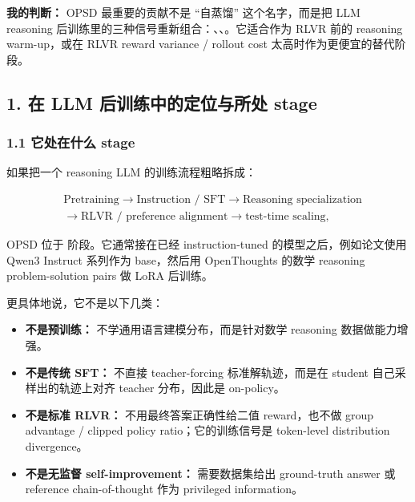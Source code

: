\begin{summarybox}
\textbf{我的判断：} OPSD 最重要的贡献不是 ``自蒸馏'' 这个名字，而是把 LLM reasoning 后训练里的三种信号重新组合：、、。它适合作为 RLVR 前的 reasoning warm-up，或在 RLVR reward variance / rollout cost 太高时作为更便宜的替代阶段。
\end{summarybox}

\subsection{1. 在 LLM 后训练中的定位与所处 stage}

\subsubsection{1.1 它处在什么 stage}

如果把一个 reasoning LLM 的训练流程粗略拆成：

\[
\begin{aligned}
&\text{Pretraining}
\rightarrow
\text{Instruction / SFT}
\rightarrow
\text{Reasoning specialization}
\\
&\rightarrow
\text{RLVR / preference alignment}
\rightarrow
\text{test-time scaling},
\end{aligned}
\]

OPSD 位于  阶段。它通常接在已经 instruction-tuned 的模型之后，例如论文使用 Qwen3 Instruct 系列作为 base，然后用 OpenThoughts 的数学 reasoning problem-solution pairs 做 LoRA 后训练。

更具体地说，它不是以下几类：

\begin{itemize}[leftmargin=1.5em]
  \item \textbf{不是预训练：} 不学通用语言建模分布，而是针对数学 reasoning 数据做能力增强。
  \item \textbf{不是传统 SFT：} 不直接 teacher-forcing 标准解轨迹，而是在 student 自己采样出的轨迹上对齐 teacher 分布，因此是 on-policy。
  \item \textbf{不是标准 RLVR：} 不用最终答案正确性给二值 reward，也不做 group advantage / clipped policy ratio；它的训练信号是 token-level distribution divergence。
  \item \textbf{不是无监督 self-improvement：} 需要数据集给出 ground-truth answer 或 reference chain-of-thought 作为 privileged information。
\end{itemize}

